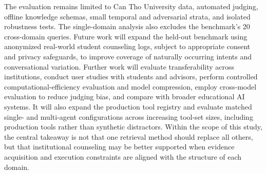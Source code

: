The evaluation remains limited to Can Tho University data, automated judging, offline knowledge schemas, small temporal and adversarial strata, and isolated robustness tests. The single-domain analysis also excludes the benchmark's 20 cross-domain queries. Future work will expand the held-out benchmark using anonymized real-world student counseling logs, subject to appropriate consent and privacy safeguards, to improve coverage of naturally occurring intents and conversational variation. Further work will evaluate transferability across institutions, conduct user studies with students and advisors, perform controlled computational-efficiency evaluation and model compression, employ cross-model evaluation to reduce judging bias, and compare \system{} with broader educational AI systems. It will also expand the production tool registry and evaluate matched single- and multi-agent configurations across increasing tool-set sizes, including production tools rather than synthetic distractors. Within the scope of this study, the central takeaway is not that one retrieval method should replace all others, but that institutional counseling may be better supported when evidence acquisition and execution constraints are aligned with the structure of each domain.

